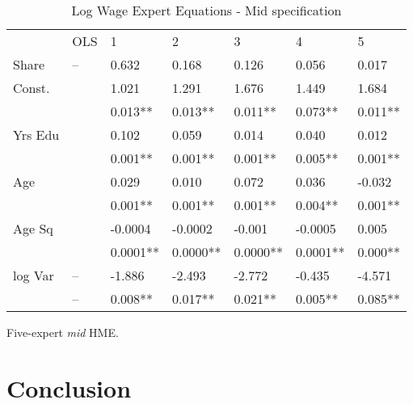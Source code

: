 \documentclass[12pt]{article}
\begin{document}
\begin{table} \centering
  \caption{Log Wage Expert Equations - Mid specification}
  \begin{threeparttable}
    \begin{tabular}[l]{l l l l l l l}
      \cmidrule{1-7}

                  & OLS & 1       & 2       &3 &4 & 5  \\
      \cmidrule{1-7}

      Share       & --  & 0.632   & 0.168   & 0.126   & 0.056   & 0.017     \\[0.3cm]

      Const.      &     & 1.021   & 1.291   & 1.676   & 1.449   & 1.684    \\
                  &     & 0.013** & 0.013** & 0.011** & 0.073** & 0.011**   \\[0.3cm]
      
      Yrs Edu     &     & 0.102   & 0.059   & 0.014   & 0.040   & 0.012    \\
                  &     & 0.001** & 0.001** & 0.001** & 0.005** & 0.001**  \\[0.3cm]

      Age         &     & 0.029   & 0.010   & 0.072   & 0.036   & -0.032    \\
                  &     & 0.001** & 0.001** & 0.001** & 0.004** & 0.001**  \\[0.3cm]

      Age Sq      &     & -0.0004 & -0.0002 & -0.001  & -0.0005 & 0.005   \\
                  &     & 0.0001**& 0.0000**& 0.0000**& 0.0001**& 0.000**  \\[0.3cm]
      
      log Var     & --   & -1.886 & -2.493  & -2.772  & -0.435  & -4.571     \\
                  & --   & 0.008**& 0.017** & 0.021** & 0.005** & 0.085**    \\[0.3cm]


      \hline
    \end{tabular}
    \begin{tablenotes}
      \item[1]{\footnotesize Five-expert \textit{mid} HME.}
    \end{tablenotes} \label{tbl:model_local_expert_regressions}
  \end{threeparttable}
\end{table}


\section{Conclusion} \label{sec:Conclusion}
\end{document}
